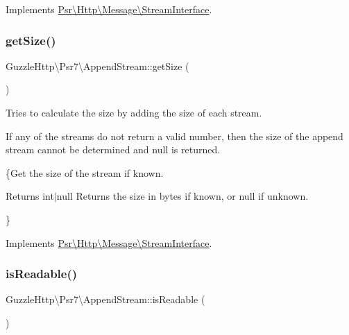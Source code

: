 Implements \hyperlink{interfacePsr_1_1Http_1_1Message_1_1StreamInterface_ac5e77fbbc7ba4235a4041d966f3aaa84}{Psr\textbackslash{}\+Http\textbackslash{}\+Message\textbackslash{}\+Stream\+Interface}.

\mbox{\label{classGuzzleHttp_1_1Psr7_1_1AppendStream_a72ee87e5953f8de4ccfe5af3cc45cf96}} 
\subsubsection{\texorpdfstring{get\+Size()}{getSize()}}
{\footnotesize\ttfamily Guzzle\+Http\textbackslash{}\+Psr7\textbackslash{}\+Append\+Stream\+::get\+Size (\begin{DoxyParamCaption}{ }\end{DoxyParamCaption})}

Tries to calculate the size by adding the size of each stream.

If any of the streams do not return a valid number, then the size of the append stream cannot be determined and null is returned.

\{Get the size of the stream if known.

\begin{DoxyReturn}{Returns}
int$\vert$null Returns the size in bytes if known, or null if unknown.
\end{DoxyReturn}
\} 

Implements \hyperlink{interfacePsr_1_1Http_1_1Message_1_1StreamInterface_a85b9ff28e3ee39d95a47e623d866cf76}{Psr\textbackslash{}\+Http\textbackslash{}\+Message\textbackslash{}\+Stream\+Interface}.

\mbox{\label{classGuzzleHttp_1_1Psr7_1_1AppendStream_ac4f681286686c5c62838293e96734bdd}} 
\subsubsection{\texorpdfstring{is\+Readable()}{isReadable()}}
{\footnotesize\ttfamily Guzzle\+Http\textbackslash{}\+Psr7\textbackslash{}\+Append\+Stream\+::is\+Readable (\begin{DoxyParamCaption}{ }\end{DoxyParamCaption})}


